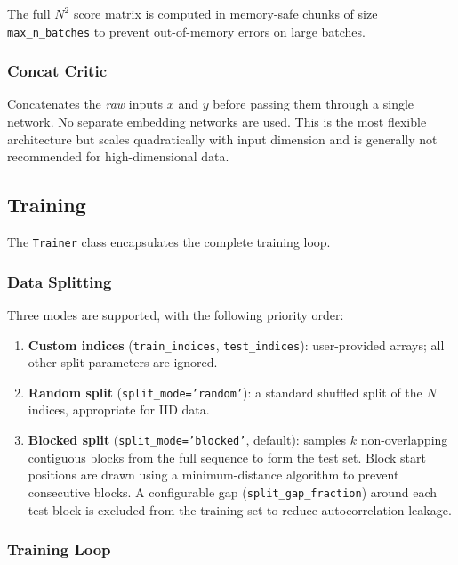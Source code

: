 \documentclass[12pt]{article}
\newcommand{\api}[1]{\texttt{#1}}
\begin{document}
The full $N^2$ score matrix is computed in memory-safe chunks of size
\api{max\_n\_batches} to prevent out-of-memory errors on large batches.

\subsubsection{Concat Critic}

Concatenates the \emph{raw} inputs $x$ and $y$ before passing them through
a single network.  No separate embedding networks are used.  This is the
most flexible architecture but scales quadratically with input dimension
and is generally not recommended for high-dimensional data.

\subsection{Training}
\label{sec:arch:training}

The \api{Trainer} class encapsulates the complete training loop.

\subsubsection{Data Splitting}

Three modes are supported, with the following priority order:

\begin{enumerate}[leftmargin=*]
  \item \textbf{Custom indices} (\api{train\_indices}, \api{test\_indices}):
        user-provided arrays; all other split parameters are ignored.
  \item \textbf{Random split} (\api{split\_mode='random'}):
        a standard shuffled split of the $N$ indices, appropriate for IID data.
  \item \textbf{Blocked split} (\api{split\_mode='blocked'}, default):
        samples $k$ non-overlapping contiguous blocks from the full sequence to
        form the test set.  Block start positions are drawn using a minimum-distance
        algorithm to prevent consecutive blocks.  A configurable gap
        (\api{split\_gap\_fraction}) around each test block is excluded from the
        training set to reduce autocorrelation leakage.
\end{enumerate}

\subsubsection{Training Loop}
\end{document}
